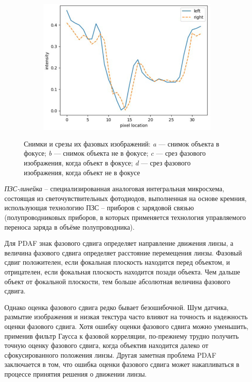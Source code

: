 \begin{figure}[!htbp]
\begin{subfigure}[t]{0.45\linewidth}
		\caption{}
		\label{fig:phase_image-c}
	\end{subfigure}
	\hfill
	\begin{subfigure}[t]{0.45\linewidth}
		\centering
		\includegraphics[width=.85\linewidth]{my_folder/images/phase_image_4}
		\caption{}
		\label{fig:phase_image-d}
	\end{subfigure}
	\caption{Снимки и срезы их фазовых изображений: {\itshape a} --- снимок объекта в фокусе; {\itshape b} --- снимок объекта не в фокусе; {\itshape c} --- срез фазового изображения, когда объект в фокусе; {\itshape d} --- срез фазового изображения, когда объект не в фокусе}
	\label{fig:phase_images}  
\end{figure}

\textit{ПЗС-линейка} -- специализированная аналоговая интегральная микросхема, состоящая из светочувствительных фотодиодов, выполненная на основе кремния, использующая технологию ПЗС -- приборов с зарядовой связью (полупроводниковых приборов, в которых применяется технология управляемого переноса заряда в объёме полупроводника).

Для PDAF знак фазового сдвига определяет направление движения линзы, а величина фазового сдвига определяет расстояние перемещения линзы. Фазовый сдвиг положителен, если фокальная плоскость находится перед объектом, и отрицателен, если фокальная плоскость находится позади объекта. Чем дальше объект от фокальной плоскости, тем больше абсолютная величина фазового сдвига.

Однако оценка фазового сдвига редко бывает безошибочной. Шум датчика, размытие изображения и низкая текстура часто влияют на точность и надежность оценки фазового сдвига. Хотя ошибку оценки фазового сдвига можно уменьшить, применив фильтр Гаусса к фазовой корреляции, по-прежнему трудно получить точную оценку фазового сдвига, когда объектив находится далеко от сфокусированного положения линзы. Другая заметная проблема PDAF заключается в том, что ошибка оценки фазового сдвига может накапливаться в процессе принятия решения о движении линзы.

